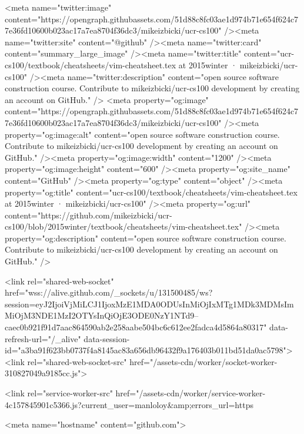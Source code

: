       <meta name="twitter:image" content="https://opengraph.githubassets.com/51d88c8fc03ae1d974b71e654f624c77e36fd10600b023ac17a7ea8704f36dc3/mikeizbicki/ucr-cs100" /><meta name="twitter:site" content="@github" /><meta name="twitter:card" content="summary_large_image" /><meta name="twitter:title" content="ucr-cs100/textbook/cheatsheets/vim-cheatsheet.tex at 2015winter · mikeizbicki/ucr-cs100" /><meta name="twitter:description" content="open source software construction course. Contribute to mikeizbicki/ucr-cs100 development by creating an account on GitHub." />
  <meta property="og:image" content="https://opengraph.githubassets.com/51d88c8fc03ae1d974b71e654f624c77e36fd10600b023ac17a7ea8704f36dc3/mikeizbicki/ucr-cs100" /><meta property="og:image:alt" content="open source software construction course. Contribute to mikeizbicki/ucr-cs100 development by creating an account on GitHub." /><meta property="og:image:width" content="1200" /><meta property="og:image:height" content="600" /><meta property="og:site_name" content="GitHub" /><meta property="og:type" content="object" /><meta property="og:title" content="ucr-cs100/textbook/cheatsheets/vim-cheatsheet.tex at 2015winter · mikeizbicki/ucr-cs100" /><meta property="og:url" content="https://github.com/mikeizbicki/ucr-cs100/blob/2015winter/textbook/cheatsheets/vim-cheatsheet.tex" /><meta property="og:description" content="open source software construction course. Contribute to mikeizbicki/ucr-cs100 development by creating an account on GitHub." />
  


      <link rel="shared-web-socket" href="wss://alive.github.com/_sockets/u/131500485/ws?session=eyJ2IjoiVjMiLCJ1IjoxMzE1MDA0ODUsInMiOjIxMTg1MDk3MDMsImMiOjM3NDE1MzI2OTYsInQiOjE3ODE0NzY1NTd9--caec0b921f91d7aac864590ab2e258aabe504bc6c612ee2fadca4d5864a80317" data-refresh-url="/_alive" data-session-id="a3ba91f623bb0737f4a8145ac83a656db96432f9a176403b011bd51da0ac5798">
      <link rel="shared-web-socket-src" href="/assets-cdn/worker/socket-worker-310827049a9185cc.js">

      <link rel="service-worker-src" href="/assets-cdn/worker/service-worker-4c157845901c5366.js?current_user=manloloy&amp;errors_url=https%

      <meta name="hostname" content="github.com">


